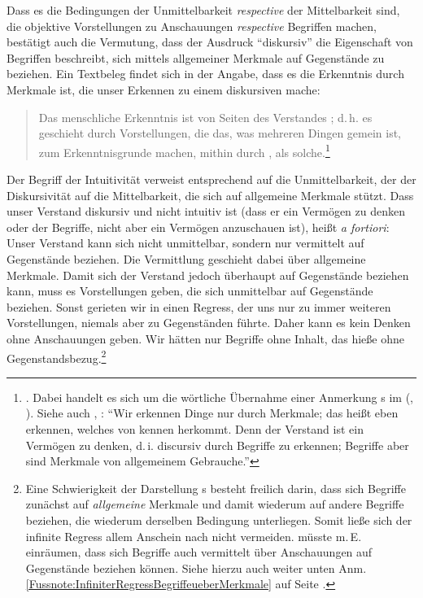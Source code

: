 Dass es die Bedingungen der Unmittelbarkeit \emph{respective} der Mittelbarkeit
sind, die objektive Vorstellungen zu Anschauungen \emph{respective} Begriffen
machen, bestätigt auch die Vermutung, dass der Ausdruck \enquote{diskursiv} die
Eigenschaft von Begriffen beschreibt, sich mittels allgemeiner Merkmale auf
Gegenstände zu beziehen. Ein Textbeleg findet sich in der Angabe, dass es die
Erkenntnis durch Merkmale ist, die unser Erkennen zu einem diskursiven mache:
\begin{quote}
Das menschliche Erkenntnis ist von Seiten des Verstandes ; d.\,h.
es geschieht durch Vorstellungen, die das, was mehreren Dingen gemein ist, zum
Erkenntnisgrunde machen, mithin durch , als
solche.\footnote{\cite[][A 84\,f.,]{Kant:ImmanuelKantsLogik1977}
\cite[][IX: 58.9--12]{Kant:GesammelteWerke1900ff.}. Dabei handelt es sich um
die wörtliche Übernahme einer Anmerkung s im
\mkbibparens{\cite[siehe][]{Kant:Reflexionen1900ff.},
\cite[][XVI: 300.8--10]{Kant:GesammelteWerke1900ff.}}. Siehe auch
\cite[][]{Kant:Reflexionen1900ff.}, \cite[][XVI:
298.7--10]{Kant:GesammelteWerke1900ff.}:
\enquote{Wir erkennen Dinge nur durch Merkmale; das heißt eben erkennen, welches
von kennen herkommt. Denn der Verstand ist ein Vermögen zu denken, d.\,i.
discursiv durch Begriffe zu erkennen; Begriffe aber sind Merkmale von
allgemeinem Gebrauche.}}
\end{quote}
Der Begriff der Intuitivität verweist entsprechend auf die Unmittelbarkeit, der
der Diskursivität auf die Mittelbarkeit, die sich auf allgemeine Merkmale
stützt. Dass unser Verstand diskursiv und nicht intuitiv ist (dass er ein
Vermögen zu denken oder der Begriffe, nicht aber ein Vermögen anzuschauen ist),
heißt \emph{a fortiori}: Unser Verstand kann sich nicht unmittelbar, sondern nur
vermittelt auf Gegenstände beziehen. Die Vermittlung geschieht dabei über
allgemeine Merkmale. Damit sich der Verstand jedoch überhaupt auf Gegenstände
beziehen kann, muss es Vorstellungen geben, die sich unmittelbar auf Gegenstände
beziehen. Sonst gerieten wir in einen Regress, der uns nur zu immer weiteren
Vorstellungen, niemals aber zu Gegenständen führte. Daher kann es kein Denken
ohne Anschauungen geben. Wir hätten nur Begriffe ohne Inhalt, das hieße ohne
Gegenstandsbezug.\footnote{Eine Schwierigkeit der Darstellung
  s besteht freilich darin, dass sich Begriffe
  zunächst auf \emph{allgemeine} Merkmale und damit wiederum auf
  andere Begriffe beziehen, die wiederum derselben Bedingung
  unterliegen. Somit ließe sich der infinite Regress allem Anschein
  nach nicht vermeiden.  müsste m.\,E. einräumen,
  dass sich Begriffe auch vermittelt über Anschauungen auf Gegenstände
  beziehen können. Siehe hierzu auch weiter unten
  Anm. \ref{Fussnote:InfiniterRegressBegriffeueberMerkmale} auf Seite
  \pageref{Fussnote:InfiniterRegressBegriffeueberMerkmale}.}

